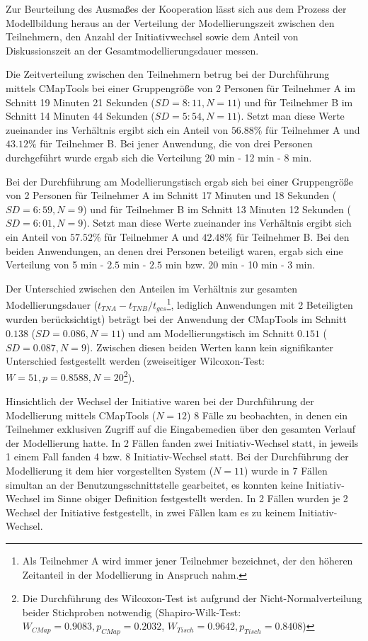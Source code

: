 Zur Beurteilung des Ausmaßes der Kooperation lässt sich aus dem Prozess der Modellbildung heraus an der Verteilung der Modellierungszeit zwischen den Teilnehmern, den Anzahl der Initiativwechsel sowie dem Anteil von Diskussionszeit an der Gesamtmodellierungsdauer messen.

Die Zeitverteilung zwischen den Teilnehmern betrug bei der Durchführung mittels CMapTools bei einer Gruppengröße von 2 Personen für Teilnehmer A im Schnitt 19 Minuten 21 Sekunden ($SD=8:11, N=11$) und für Teilnehmer B im Schnitt 14 Minuten 44 Sekunden ($SD=5:54, N=11$). Setzt man diese Werte zueinander ins Verhältnis ergibt sich ein Anteil von $56.88\%$ für Teilnehmer A und $43.12\%$ für Teilnehmer B. Bei jener Anwendung, die von drei Personen durchgeführt wurde ergab sich die Verteilung 20 min - 12 min - 8 min. 

Bei der Durchführung am Modellierungstisch ergab sich bei einer Gruppengröße von 2 Personen für Teilnehmer A im Schnitt 17 Minuten und 18 Sekunden ($SD=6:59, N=9$) und für Teilnehmer B im Schnitt 13 Minuten 12 Sekunden ($SD=6:01, N=9$). Setzt man diese Werte zueinander ins Verhältnis ergibt sich ein Anteil von $57.52\%$ für Teilnehmer A und $42.48\%$ für Teilnehmer B. Bei den beiden Anwendungen, an denen drei Personen beteiligt waren, ergab sich eine Verteilung von 5 min - $2.5$ min - $2.5$ min bzw. 20 min - 10 min - 3 min. 

Der Unterschied zwischen den Anteilen im Verhältnis zur gesamten Modellierungsdauer (${t_{TN A} - t_{TN B}}/t_{ges}$\footnote{Als Teilnehmer A wird immer jener Teilnehmer bezeichnet, der den höheren Zeitanteil in der Modellierung in Anspruch nahm.}, lediglich Anwendungen mit 2 Beteiligten wurden berücksichtigt) beträgt bei der Anwendung der CMapTools im Schnitt $0.138$ ($SD=0.086, N=11$) und am Modellierungstisch im Schnitt $0.151$ ($SD=0.087, N=9$). Zwischen diesen beiden Werten kann kein signifikanter Unterschied festgestellt werden (zweiseitiger Wilcoxon-Test: $W=51, p=0.8588, N=20$\footnote{Die Durchführung des Wilcoxon-Test ist aufgrund der Nicht-Normalverteilung beider Stichproben notwendig (Shapiro-Wilk-Test: $W_{CMap} = 0.9083, p_{CMap} = 0.2032$, $W_{Tisch}= 0.9642, p_{Tisch} = 0.8408$)}).

Hinsichtlich der Wechsel der Initiative waren bei der Durchführung der Modellierung mittels CMapTools ($N=12$) 8 Fälle zu beobachten, in denen ein Teilnehmer exklusiven Zugriff auf die Eingabemedien über den gesamten Verlauf der Modellierung hatte. In 2 Fällen fanden zwei Initiativ-Wechsel statt, in jeweils 1 einem Fall fanden 4 bzw. 8 Initiativ-Wechsel statt. Bei der Durchführung der Modellierung it dem hier vorgestellten System ($N=11$) wurde in 7 Fällen simultan an der Benutzungsschnittstelle gearbeitet, es konnten keine Initiativ-Wechsel im Sinne obiger Definition festgestellt werden. In 2 Fällen wurden je 2 Wechsel der Initiative festgestellt, in zwei Fällen kam es zu keinem Initiativ-Wechsel.

